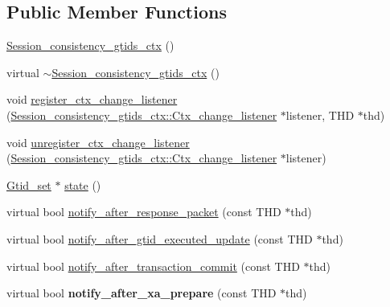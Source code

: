 \subsection*{Public Member Functions}
\begin{DoxyCompactItemize}
\item 
\mbox{\hyperlink{classSession__consistency__gtids__ctx_aec7db00cedbe30bf9b58cc725d3645a1}{Session\+\_\+consistency\+\_\+gtids\+\_\+ctx}} ()
\item 
virtual \mbox{\hyperlink{classSession__consistency__gtids__ctx_ab12040fdaf2c055e3a141881bedf0175}{$\sim$\+Session\+\_\+consistency\+\_\+gtids\+\_\+ctx}} ()
\item 
void \mbox{\hyperlink{classSession__consistency__gtids__ctx_ae8438d9a17c106351e9e7f09f11d6840}{register\+\_\+ctx\+\_\+change\+\_\+listener}} (\mbox{\hyperlink{classSession__consistency__gtids__ctx_1_1Ctx__change__listener}{Session\+\_\+consistency\+\_\+gtids\+\_\+ctx\+::\+Ctx\+\_\+change\+\_\+listener}} $\ast$listener, T\+HD $\ast$thd)
\item 
void \mbox{\hyperlink{classSession__consistency__gtids__ctx_a66c0b87081a934634af4a4055833cc51}{unregister\+\_\+ctx\+\_\+change\+\_\+listener}} (\mbox{\hyperlink{classSession__consistency__gtids__ctx_1_1Ctx__change__listener}{Session\+\_\+consistency\+\_\+gtids\+\_\+ctx\+::\+Ctx\+\_\+change\+\_\+listener}} $\ast$listener)
\item 
\mbox{\hyperlink{classGtid__set}{Gtid\+\_\+set}} $\ast$ \mbox{\hyperlink{classSession__consistency__gtids__ctx_a2eaa91e30628e35da510f820e64d3e06}{state}} ()
\item 
virtual bool \mbox{\hyperlink{classSession__consistency__gtids__ctx_a828ab638fa33aa0d43d1b162a3d34803}{notify\+\_\+after\+\_\+response\+\_\+packet}} (const T\+HD $\ast$thd)
\item 
virtual bool \mbox{\hyperlink{classSession__consistency__gtids__ctx_a2452726ebb0abc3e912d493013efc97c}{notify\+\_\+after\+\_\+gtid\+\_\+executed\+\_\+update}} (const T\+HD $\ast$thd)
\item 
virtual bool \mbox{\hyperlink{classSession__consistency__gtids__ctx_a13e57b8ec0b7eb1f24b690e82b35b89f}{notify\+\_\+after\+\_\+transaction\+\_\+commit}} (const T\+HD $\ast$thd)
\item 
\mbox{\label{classSession__consistency__gtids__ctx_a07084902ec8b14533191e495af2e54fe}} 
virtual bool {\bfseries notify\+\_\+after\+\_\+xa\+\_\+prepare} (const T\+HD $\ast$thd)
\end{DoxyCompactItemize}
